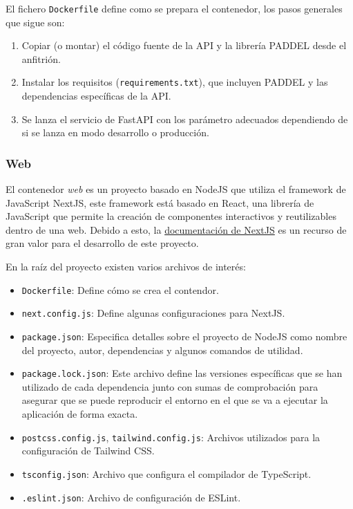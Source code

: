 El fichero \texttt{Dockerfile} define como se prepara el contenedor, los pasos
generales que sigue son:

\begin{enumerate}
    \item Copiar (o montar) el código fuente de la API y la librería PADDEL
          desde el anfitrión.
    \item Instalar los requisitos (\texttt{requirements.txt}), que incluyen
          PADDEL y las dependencias específicas de la API.
    \item Se lanza el servicio de FastAPI con los parámetro adecuados
          dependiendo de si se lanza en modo desarrollo o producción.
\end{enumerate}

\subsubsection{Web}

El contenedor \textit{web} es un proyecto basado en NodeJS que utiliza el
framework de JavaScript NextJS, este framework está basado en React, una
librería de JavaScript que permite la creación de componentes interactivos y
reutilizables dentro de una web. Debido a esto, la
\href{https://nextjs.org/docs/getting-started}{documentación de NextJS} es un
recurso de gran valor para el desarrollo de este proyecto.

En la raíz del proyecto existen varios archivos de interés:

\begin{itemize}
    \item \texttt{Dockerfile}: Define cómo se crea el contendor.
    \item \texttt{next.config.js}: Define algunas configuraciones para NextJS.
    \item \texttt{package.json}: Especifica detalles sobre el proyecto de NodeJS
          como nombre del proyecto, autor, dependencias y algunos comandos de
          utilidad.
    \item \texttt{package.lock.json}: Este archivo define las versiones
          específicas que se han utilizado de cada dependencia junto con sumas
          de comprobación para asegurar que se puede reproducir el entorno en el
          que se va a ejecutar la aplicación de forma exacta.
    \item \texttt{postcss.config.js}, \texttt{tailwind.config.js}: Archivos
          utilizados para la configuración de Tailwind CSS.
    \item \texttt{tsconfig.json}: Archivo que configura el compilador de
          TypeScript.
    \item \texttt{.eslint.json}: Archivo de configuración de ESLint.
\end{itemize}


